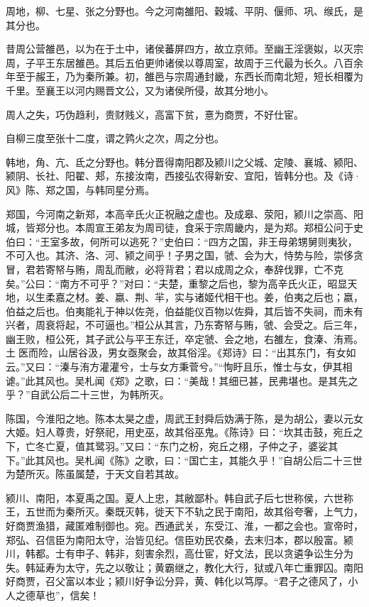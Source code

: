 \documentclass[12pt,UTF8]{ctexbook}
\begin{document}
周地，柳、七星、张之分野也。今之河南雒阳、穀城、平阴、偃师、巩、缑氏，是其分也。



昔周公营雒邑，以为在于土中，诸侯蕃屏四方，故立京师。至幽王淫褒姒，以灭宗周，子平王东居雒邑。其后五伯更帅诸侯以尊周室，故周于三代最为长久。八百余年至于赧王，乃为秦所兼。初，雒邑与宗周通封畿，东西长而南北短，短长相覆为千里。至襄王以河内赐晋文公，又为诸侯所侵，故其分地小。



周人之失，巧伪趋利，贵财贱义，高富下贫，憙为商贾，不好仕宦。



自柳三度至张十二度，谓之鹑火之次，周之分也。



韩地，角、亢、氐之分野也。韩分晋得南阳郡及颍川之父城、定陵、襄城、颍阳、颍阴、长社、阳翟、郏，东接汝南，西接弘农得新安、宜阳，皆韩分也。及《诗·风》陈、郑之国，与韩同星分焉。



郑国，今河南之新郑，本高辛氏火正祝融之虚也。及成皋、荥阳，颍川之崇高、阳城，皆郑分也。本周宣王弟友为周司徒，食采于宗周畿内，是为郑。郑桓公问于史伯曰：“王室多故，何所可以逃死？”史伯曰：“四方之国，非王母弟甥舅则夷狄，不可入也。其济、洛、河、颍之间乎！子男之国，虢、会为大，恃势与险，崇侈贪冒，君若寄帑与贿，周乱而敝，必将背君；君以成周之众，奉辞伐罪，亡不克矣。”公曰：“南方不可乎？”对曰：“夫楚，重黎之后也，黎为高辛氏火正，昭显天地，以生柔嘉之材。姜、嬴、荆、羋，实与诸姬代相干也。姜，伯夷之后也；嬴，伯益之后也。伯夷能礼于神以佐尧，伯益能仪百物以佐舜，其后皆不失祠，而未有兴者，周衰将起，不可逼也。”桓公从其言，乃东寄帑与贿，虢、会受之。后三年，幽王败，桓公死，其子武公与平王东迁，卒定虢、会之地，右雒左，食溱、洧焉。土医而险，山居谷汲，男女亟聚会，故其俗淫。《郑诗》曰：“出其东门，有女如云。”又曰：“溱与洧方灌灌兮，士与女方秉菅兮。”“恂盱且乐，惟士与女，伊其相谑。”此其风也。吴札闻《郑》之歌，曰：“美哉！其细已甚，民弗堪也。是其先之乎？”自武公后二十三世，为韩所灭。



陈国，今淮阳之地。陈本太昊之虚，周武王封舜后妫满于陈，是为胡公，妻以元女大姬。妇人尊贵，好祭祀，用史巫，故其俗巫鬼。《陈诗》曰：“坎其击鼓，宛丘之下，亡冬亡夏，值其鹭羽。”又曰：“东门之枌，宛丘之栩，子仲之子，婆娑其下。”此其风也。吴札闻《陈》之歌，曰：“国亡主，其能久乎！”自胡公后二十三世为楚所灭。陈虽属楚，于天文自若其故。



颍川、南阳，本夏禹之国。夏人上忠，其敝鄙朴。韩自武子后七世称侯，六世称王，五世而为秦所灭。秦既灭韩，徙天下不轨之民于南阳，故其俗夸奢，上气力，好商贾渔猎，藏匿难制御也。宛。西通武关，东受江、淮，一都之会也。宣帝时，郑弘、召信臣为南阳太守，治皆见纪。信臣劝民农桑，去末归本，郡以殷富。颍川，韩都。士有申子、韩非，刻害余烈，高仕宦，好文法，民以贪遴争讼生分为失。韩延寿为太守，先之以敬让；黄霸继之，教化大行，狱或八年亡重罪囚。南阳好商贾，召父富以本业；颍川好争讼分异，黄、韩化以笃厚。“君子之德风了，小人之德草也”，信矣！
\end{document}
